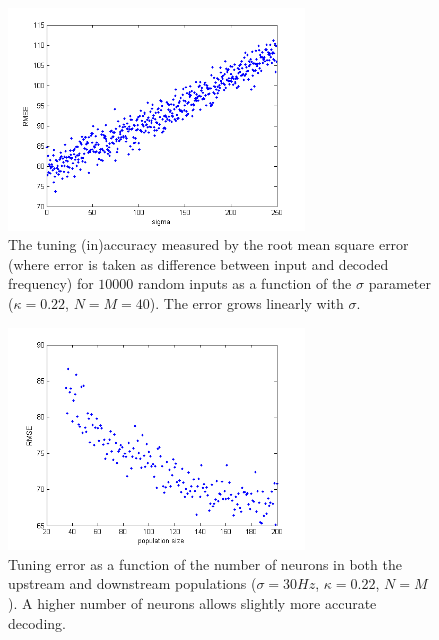 \documentclass{scrartcl}
\begin{document}
\begin{figure}
\centering
\includegraphics[trim = {0.7cm 0 0.5cm 0.2cm}, width = 0.7\textwidth, clip]{../pics/sigma}
\caption{The tuning (in)accuracy measured by the root mean square error (where error is taken as difference between input and decoded frequency) for $10000$ random inputs as a function of the $\sigma$ parameter ($\kappa=0.22$, $N=M=40$). The error grows linearly with $\sigma$.}
\end{figure}

\begin{figure}
\centering
\includegraphics[trim = {0.7cm 0 0.5cm 0.2cm}, width = 0.7\textwidth, clip]{../pics/numN}
\caption{Tuning error as a function of the number of neurons in both the upstream and downstream populations ($\sigma=30\si{Hz}$, $\kappa=0.22$, $N=M$). A higher number of neurons allows slightly more accurate decoding.}
\end{figure}
\end{document}
